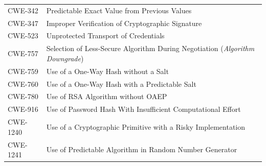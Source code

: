 \documentclass[11pt]{article}
\begin{document}
\begin{longtable}{@{}p{2.4cm}p{12.0cm}@{}}
CWE-342  & Predictable Exact Value from Previous Values \\
CWE-347  & Improper Verification of Cryptographic Signature \\
CWE-523  & Unprotected Transport of Credentials \\
CWE-757  & Selection of Less-Secure Algorithm During Negotiation (\textit{Algorithm Downgrade}) \\
CWE-759  & Use of a One-Way Hash without a Salt \\
CWE-760  & Use of a One-Way Hash with a Predictable Salt \\
CWE-780  & Use of RSA Algorithm without OAEP \\
CWE-916  & Use of Password Hash With Insufficient Computational Effort \\
CWE-1240 & Use of a Cryptographic Primitive with a Risky Implementation \\
CWE-1241 & Use of Predictable Algorithm in Random Number Generator \\

\end{longtable}
\end{document}
